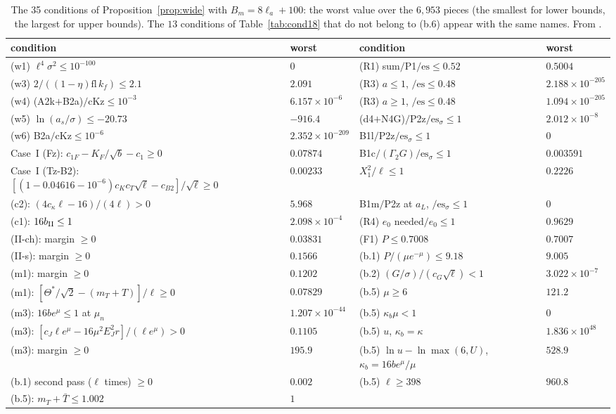 \begin{table}
\caption{The 35 conditions of Proposition~\ref{prop:wide} with $B_m=8\ell_a+100$: the worst value over the $6{,}953$ pieces (the smallest for lower bounds, the largest for upper bounds). The $13$ conditions of Table~\ref{tab:cond18} that do not belong to (b.6) appear with the same names. From .}
\label{tab:cond35}
\begin{ruledtabular}
\small
\begin{tabular}{p{}p{}p{}p{}}
condition & worst & condition & worst\\ \hline
(w1) $\ell^4\sigma^2\le10^{-100}$ & $0$ & (R1) sum$/$P1$/\mathrm{es}\le0.52$ & $0.5004$\\
(w3) $2/((1-\eta)\mathrm{fl}\,k_f)\le2.1$ & $2.091$ & (R3) $a\le1$, $/\mathrm{es}\le0.48$ & $2.188\times10^{-205}$\\
(w4) (A2k$+$B2a)$/$cKz$\le10^{-3}$ & $6.157\times10^{-6}$ & (R3) $a\ge1$, $/\mathrm{es}\le0.48$ & $1.094\times10^{-205}$\\
(w5) $\ln(a_s/\sigma)\le-20.73$ & $-916.4$ & (d4$+$N4G)$/$P2z$/\mathrm{es}_\sigma\le1$ & $2.012\times10^{-8}$\\
(w6) B2a$/$cKz$\le10^{-6}$ & $2.352\times10^{-209}$ & B1l$/$P2z$/\mathrm{es}_\sigma\le1$ & $0$\\
Case~I (Fz): $c_{1F}-K_F/\sqrt b-c_1\ge0$ & $0.07874$ & B1c$/(\Gamma_2G)/\mathrm{es}_\sigma\le1$ & $0.003591$\\
Case~I (Tz-B2): $[(1-0.04616-10^{-6})c_Kc_T\sqrt\ell-c_{B2}]/\sqrt\ell\ge0$ & $0.00233$ & $X_1^2/\ell\le1$ & $0.2226$\\
(c2): $(4c_\kappa\ell-16)/(4\ell)>0$ & $5.968$ & B1m$/$P2z at $a_L$, $/\mathrm{es}_\sigma\le1$ & $0$\\
(c1): $16b_{\rm II}\le1$ & $2.098\times10^{-4}$ & (R4) $e_0$ needed$/e_0\le1$ & $0.9629$\\
(II-ch): margin $\ge0$ & $0.03831$ & (F1) $P\le0.7008$ & $0.7007$\\
(II-s): margin $\ge0$ & $0.1566$ & (b.1) $P/(\mu e^{-\mu})\le9.18$ & $9.005$\\
(m1): margin $\ge0$ & $0.1202$ & (b.2) $(G/\sigma)/(c_G\sqrt\ell)<1$ & $3.022\times10^{-7}$\\
(m1): $[\Theta^*/\sqrt2-(m_T+T)]/\ell\ge0$ & $0.07829$ & (b.5) $\mu\ge6$ & $121.2$\\
(m3): $16be^\mu\le1$ at $\mu_n$ & $1.207\times10^{-44}$ & (b.5) $\kappa_b\mu<1$ & $0$\\
(m3): $[c_J\ell e^\mu-16\mu^2E_J^2r]/(\ell e^\mu)>0$ & $0.1105$ & (b.5) $u$, $\kappa_b=\kappa$ & $1.836\times10^{48}$\\
(m3): margin $\ge0$ & $195.9$ & (b.5) $\ln u-\ln\max(6,U)$, $\kappa_b=16be^\mu/\mu$ & $528.9$\\
(b.1) second pass ($\ell$ times) $\ge0$ & $0.002$ & (b.5) $\ell\ge398$ & $960.8$\\
(b.5): $m_T+\bar T\le1.002$ & $1$ &  & \\
\end{tabular}
\end{ruledtabular}
\end{table}
